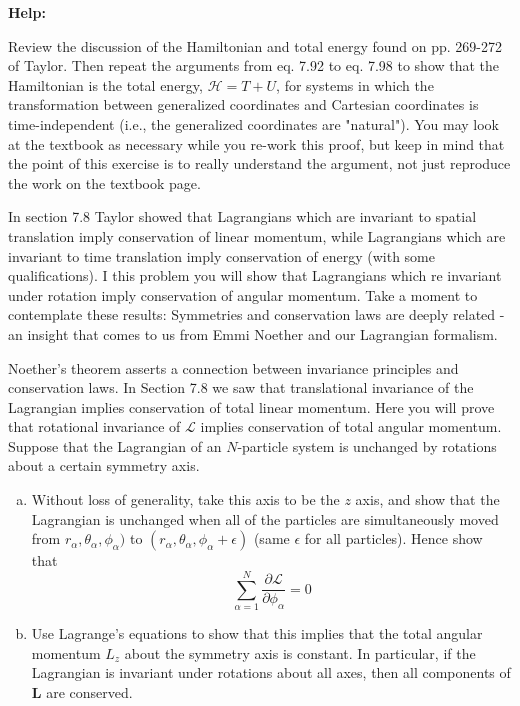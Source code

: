 \documentclass[11pt,letterpaper,boxed]{../hmcpset}
\renewcommand{\vec}[1]{\mathbf{#1}}
\def\Lagr{\mathcal{L}}
\begin{document}
\textbf{Help:} 

\begin{problem}[i]
Review the discussion of the Hamiltonian and total energy found on pp. 269-272 of Taylor. Then repeat the arguments from eq. 7.92 to eq. 7.98 to show that the Hamiltonian is the total energy, $\mathcal{H} = T + U$, for systems in which the transformation between generalized coordinates and Cartesian coordinates is time-independent (i.e., the generalized coordinates are "natural"). You may look at the textbook as necessary while you re-work this proof, but keep in mind that the point of this exercise is to really understand the argument, not just reproduce the work on the textbook page.
\end{problem}

\begin{solution}

\vfill
\end{solution}

\newpage 

\begin{problem}[ii]
In section 7.8 Taylor showed that Lagrangians which are invariant to spatial translation imply conservation of linear momentum, while Lagrangians which are invariant to time translation imply conservation of energy (with some qualifications). I this problem you will show that Lagrangians which re invariant under rotation imply conservation of angular momentum. Take a moment to contemplate these results: Symmetries and conservation laws are deeply related - an insight that comes to us from Emmi Noether and our Lagrangian formalism.

\begin{problem}[7.46]
Noether's theorem asserts a connection between invariance principles and conservation laws. In Section 7.8 we saw that translational invariance of the Lagrangian implies conservation of total linear momentum. Here you will prove that rotational invariance of $\Lagr$ implies conservation of total angular momentum. Suppose that the Lagrangian of an $N$-particle system is unchanged by rotations about a certain symmetry axis.
\begin{enumerate}[(a)]
\item Without loss of generality, take this axis to be the $z$ axis, and show that the Lagrangian is unchanged when all of the particles are simultaneously moved from $r_\alpha, \theta_\alpha, \phi_\alpha)$ to $(r_\alpha, \theta_\alpha, \phi_\alpha + \epsilon)$ (same $\epsilon$ for all particles). Hence show that 
\[	\sum_{\alpha = 1}^N \frac{\partial \Lagr}{\partial \phi_\alpha} = 0\]
\item Use Lagrange's equations to show that this implies that the total angular momentum $L_z$ about the symmetry axis is constant. In particular, if the Lagrangian is invariant under rotations about all axes, then all components of $\vec L$ are conserved.

\end{enumerate}
\end{problem}
\end{problem}

\begin{solution}

\vfill
\end{solution}
\end{document}

